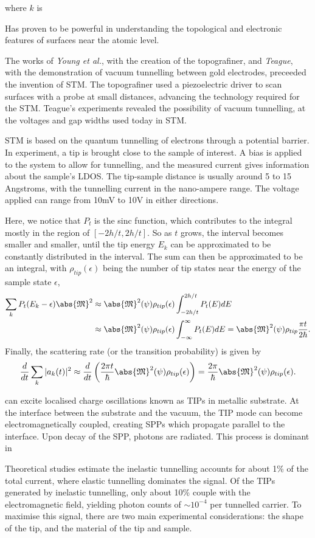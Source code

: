 where $k$ is 

Has proven to be powerful in understanding the topological and electronic features of surfaces near the atomic level. 

The works \citep{tersoff19931} of \textit{Young et al.}, with the creation of the topografiner, and \textit{Teague}, with the demonstration of vacuum tunnelling between gold electrodes, preceeded the invention of \ac{STM}. The topografiner used a piezoelectric driver to scan surfaces with a probe at small distances, advancing the technology required for the \ac{STM}. Teague's experiments revealed the possibility of vacuum tunnelling, at the voltages and gap widths used today in \ac{STM}. 

\ac{STM} is based on the quantum tunnelling of electrons through a potential barrier. In experiment, a tip is brought close to the sample of interest. A bias is applied to the system to allow for tunnelling, and the measured current gives information about the sample's \ac{LDOS}. The tip-sample distance is usually around 5 to 15 Angstroms, with the tunnelling current in the nano-ampere range. The voltage applied can range from 10mV to 10V in either directions.


Here, we notice that $P_t$ is the sinc function, which contributes to the integral mostly in the region of $[-2h/t, 2h/t]$. So as $t$ grows, the interval becomes smaller and smaller, until the tip energy $E_k$ can be approximated to be constantly distributed in the interval. The sum can then be approximated to be an integral, with $\rho_{tip}(\epsilon)$ being the number of tip states near the energy of the sample state $\epsilon$, 
\begin{align}
\sum_k P_t(E_k - \epsilon) \abs{\mathfrak{M}}^2 &\approx \abs{\mathfrak{M}}^2(\psi) \rho_{tip}(\epsilon) \int_{-2h/t}^{2h/t} P_t(E) dE \\
& \approx \abs{\mathfrak{M}}^2(\psi) \rho_{tip}(\epsilon) \int_{-\infty}^{\infty} P_t(E) dE = \abs{\mathfrak{M}}^2(\psi) \rho_{tip} \frac{\pi t}{2\hbar}.
\end{align}
Finally, the scattering rate (or the transition probability) is given by
\begin{equation}
\frac{d}{dt} \sum_k |a_k(t)|^2 \approx \frac{d}{dt}\left( \frac{2\pi t}{\hbar} \abs{\mathfrak{M}}^2(\psi) \rho_{tip}(\epsilon) \right) = \frac{2 \pi}{\hbar} \abs{\mathfrak{M}}^2(\psi) \rho_{tip}(\epsilon).
\end{equation}

can excite localised charge oscillations known as \acp{TIP} in metallic substrate. At the interface between the substrate and the vacuum, the \ac{TIP} mode can become electromagnetically coupled, creating \acp{SPP} which propagate parallel to the interface. Upon decay of the \ac{SPP}, photons are radiated. This process is dominant in 

Theoretical studies estimate the inelastic tunnelling accounts for about 1\% of the total current,  where elastic tunnelling dominates the signal. Of the \acp{TIP} generated by inelastic tunnelling, only about 10\% couple with the electromagnetic field, yielding photon counts of $\sim 10^{-4}$ per tunnelled carrier. To maximise this signal, there are two main experimental considerations: the shape of the tip, and the material of the tip and sample.
